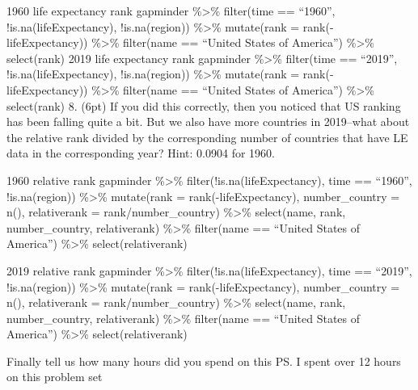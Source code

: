 \documentclass[]{article}
\begin{document}
1960 life expectancy rank gapminder \%\textgreater{}\% filter(time ==
``1960'', !is.na(lifeExpectancy), !is.na(region)) \%\textgreater{}\%
mutate(rank = rank(-lifeExpectancy)) \%\textgreater{}\% filter(name ==
``United States of America'') \%\textgreater{}\% select(rank) 2019 life
expectancy rank gapminder \%\textgreater{}\% filter(time == ``2019'',
!is.na(lifeExpectancy), !is.na(region)) \%\textgreater{}\% mutate(rank =
rank(-lifeExpectancy)) \%\textgreater{}\% filter(name == ``United States
of America'') \%\textgreater{}\% select(rank) 8. (6pt) If you did this
correctly, then you noticed that US ranking has been falling quite a
bit. But we also have more countries in 2019--what about the relative
rank divided by the corresponding number of countries that have LE data
in the corresponding year? Hint: 0.0904 for 1960.

1960 relative rank gapminder \%\textgreater{}\%
filter(!is.na(lifeExpectancy), time == ``1960'', !is.na(region))
\%\textgreater{}\% mutate(rank = rank(-lifeExpectancy), number\_country
= n(), relativerank = rank/number\_country) \%\textgreater{}\%
select(name, rank, number\_country, relativerank) \%\textgreater{}\%
filter(name == ``United States of America'') \%\textgreater{}\%
select(relativerank)

2019 relative rank gapminder \%\textgreater{}\%
filter(!is.na(lifeExpectancy), time == ``2019'', !is.na(region))
\%\textgreater{}\% mutate(rank = rank(-lifeExpectancy), number\_country
= n(), relativerank = rank/number\_country) \%\textgreater{}\%
select(name, rank, number\_country, relativerank) \%\textgreater{}\%
filter(name == ``United States of America'') \%\textgreater{}\%
select(relativerank)

Finally tell us how many hours did you spend on this PS. I spent over 12
hours on this problem set
\end{document}
